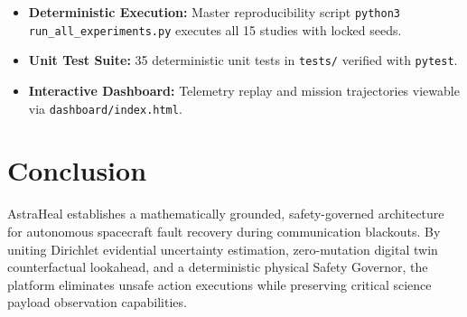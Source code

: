 \documentclass[conference]{IEEEtran}
\begin{document}
\begin{itemize}
    \item \textbf{Deterministic Execution:} Master reproducibility script \texttt{python3 run\_all\_experiments.py} executes all 15 studies with locked seeds.
    \item \textbf{Unit Test Suite:} 35 deterministic unit tests in \texttt{tests/} verified with \texttt{pytest}.
    \item \textbf{Interactive Dashboard:} Telemetry replay and mission trajectories viewable via \texttt{dashboard/index.html}.
\end{itemize}

\section{Conclusion}
AstraHeal establishes a mathematically grounded, safety-governed architecture for autonomous spacecraft fault recovery during communication blackouts. By uniting Dirichlet evidential uncertainty estimation, zero-mutation digital twin counterfactual lookahead, and a deterministic physical Safety Governor, the platform eliminates unsafe action executions while preserving critical science payload observation capabilities.



\end{document}
